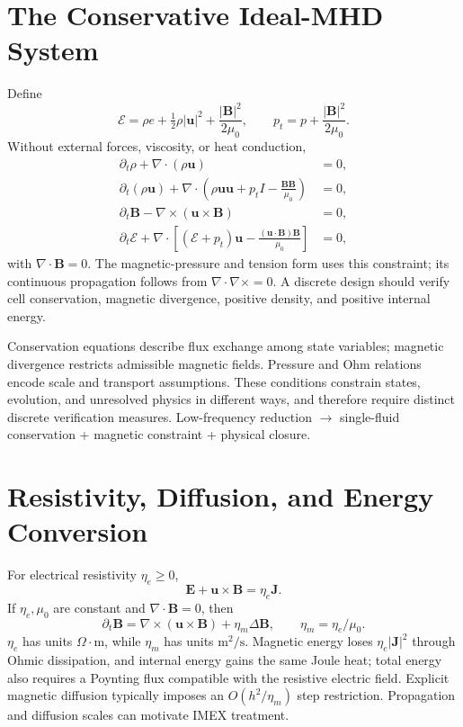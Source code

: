 \section{The Conservative Ideal-MHD System}
Define
\[
\mathcal E=\rho e+\tfrac12\rho|\bm u|^2+\frac{|\bm B|^2}{2\mu_0},
\qquad p_t=p+\frac{|\bm B|^2}{2\mu_0}.
\]
Without external forces, viscosity, or heat conduction,
\begin{equation}\label{eq:ideal-mhd}
\begin{aligned}
\partial_t\rho+\nabla\cdot(\rho\bm u)&=0,\\
\partial_t(\rho\bm u)+\nabla\cdot
\left(\rho\bm u\bm u+p_tI-\frac{\bm B\bm B}{\mu_0}\right)&=0,\\
\partial_t\bm B-\nabla\times(\bm u\times\bm B)&=0,\\
\partial_t\mathcal E+\nabla\cdot
\left[(\mathcal E+p_t)\bm u-\frac{(\bm u\cdot\bm B)\bm B}{\mu_0}\right]&=0,
\end{aligned}
\end{equation}
with $\nabla\cdot\bm B=0$.
The magnetic-pressure and tension form uses this constraint; its continuous propagation follows from $\nabla\cdot\nabla\times=0$.
A discrete design should verify cell conservation, magnetic divergence, positive density, and positive internal energy.

{Conservation equations describe flux exchange among state variables; magnetic divergence restricts admissible magnetic fields.
Pressure and Ohm relations encode scale and transport assumptions. These conditions constrain states, evolution, and unresolved physics in different ways,
and therefore require distinct discrete verification measures.}
{Low-frequency reduction $\longrightarrow$ single-fluid conservation + magnetic constraint + physical closure.}

\section{Resistivity, Diffusion, and Energy Conversion}
For electrical resistivity $\eta_e\ge0$,
\[
\bm E+\bm u\times\bm B=\eta_e\bm J.
\]
If $\eta_e,\mu_0$ are constant and $\nabla\cdot\bm B=0$, then
\[
\partial_t\bm B=\nabla\times(\bm u\times\bm B)
+\eta_m\Delta\bm B,\qquad \eta_m=\eta_e/\mu_0.
\]
$\eta_e$ has units $\Omega\cdot\mathrm m$, while $\eta_m$ has units $\mathrm m^2/\mathrm s$.
Magnetic energy loses $\eta_e|\bm J|^2$ through Ohmic dissipation, and internal energy gains the same Joule heat;
total energy also requires a Poynting flux compatible with the resistive electric field.
Explicit magnetic diffusion typically imposes an $O(h^2/\eta_m)$ step restriction. Propagation and diffusion scales can motivate IMEX treatment.

